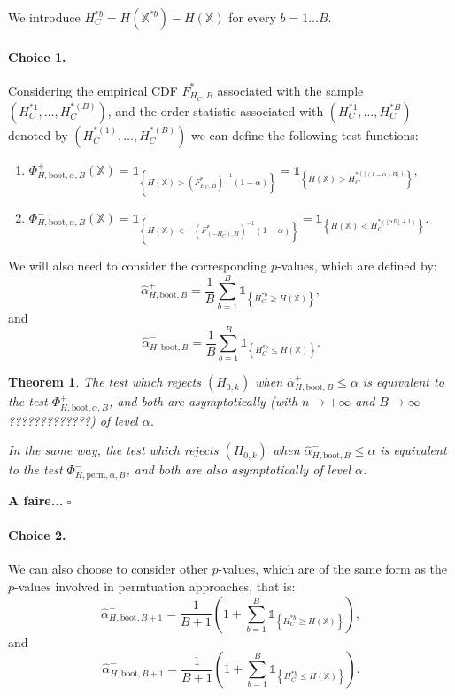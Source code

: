 \documentclass[a4paper,oneside,10pt]{article}
\newtheorem{thm}{Theorem}[subsection]
\newenvironment{dem}{\noindent{\bf Proof :}}{\hfill             %
  $\square$\par \noindent}
\newcommand{\pa}[1]{\ensuremath{\left( #1 \right)}}
\newcommand{\X}{\ensuremath{\mathds{X}}}
\newcommand{\1}[1]{\ensuremath{\mathds{1}_{\left\{ #1 \right\}}}}  %
\begin{document}
We introduce $H_C^{* b}=H(\X^{* b})-H(\X)$ for every $b=1\ldots B$.

\paragraph{Choice 1.}

Considering the empirical CDF $F^*_{H_C,B}$ associated with the sample $\pa{H_C^{* 1},\ldots,H_C^{* (B)}}$, and the order statistic associated with  $\pa{H_C^{* 1},\ldots,H_C^{* B}}$ denoted by
$\pa{H_C^{* (1)},\ldots,H_C^{* (B)}}$ we can define the following test functions:

\begin{enumerate}
\item $\Phi_{H,\textrm{boot},\alpha,B}^{+}(\X)=\1{H(\X)>\pa{F^*_{H_C,B}}^{-1}(1-\alpha)}=\1{H(\X)>H_C^{* (\lceil (1-\alpha)B\rceil)}},$
\item $\Phi_{H,\textrm{boot},\alpha,B}^{-}(\X)=\1{H(\X)<-\pa{F^*_{(-H_C),B}}^{-1}(1-\alpha)}=\1{H(\X)<H_C^{* (\lfloor \alpha B \rfloor + 1 )}}.$ 
\end{enumerate}

We will also need to consider the corresponding $p$-values, which are defined by:
$$\hat{\alpha}^+_{H,\textrm{boot},B}=\frac{1}{B}\sum_{b=1}^{B} \1{H_C^{* b} \geq H(\X)},$$
and 
$$\hat{\alpha}^-_{H,\textrm{boot},B}=\frac{1}{B}\sum_{b=1}^{B} \1{H_C^{* b}\leq H(\X)}.$$

\begin{thm}\label{Th_bootstrap1}
The test which rejects $(H_{0,k})$ when $\hat{\alpha}^+_{H,\textrm{boot},B}\leq \alpha$ is equivalent to the test $\Phi_{H,\textrm{boot},\alpha,B}^+$, and both are asymptotically  (with $n\to +\infty$ and $B\to\infty$ ?????????????) of level $\alpha$.

In the same way, the test which rejects $(H_{0,k})$ when $\hat{\alpha}^-_{H,\textrm{boot},B}\leq \alpha$ is equivalent to the test $ \Phi_{H,\textrm{perm},\alpha,B}^-$, and both are also asymptotically of level $\alpha$.
\end{thm}

\begin{dem}
{\bf A faire...}
\end{dem}

\paragraph{Choice 2.}

We can also choose to consider other $p$-values, which are of the same form as the $p$-values involved in permtuation approaches, that is:
$$\hat{\alpha}^+_{H,\textrm{boot},B+1}=\frac{1}{B+1}\left(1+\sum_{b=1}^{B} \1{H_C^{* b} \geq H(\X)}\right),$$
and 
$$\hat{\alpha}^-_{H,\textrm{boot},B+1}=\frac{1}{B+1}\left(1+\sum_{b=1}^{B} \1{H_C^{* b}\leq H(\X)}\right).$$
\end{document}
